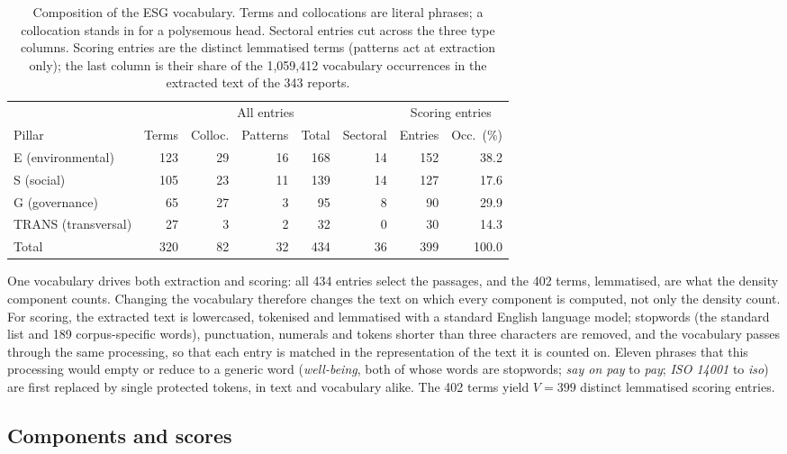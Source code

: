 \begin{table}[tbp]
\centering
\small
\caption{Composition of the ESG vocabulary. Terms and collocations are literal
phrases; a collocation stands in for a polysemous head. Sectoral entries cut
across the three type columns. Scoring entries are the distinct lemmatised
terms (patterns act at extraction only); the last column is their share of the
1,059,412 vocabulary occurrences in the extracted text of the 343 reports.}
\label{tab:method-vocab}
\begin{tabular}{@{}lrrrrrrr@{}}
\toprule
 & \multicolumn{5}{c}{All entries} & \multicolumn{2}{c}{Scoring entries} \\
\cmidrule(lr){2-6}\cmidrule(l){7-8}
Pillar & Terms & Colloc. & Patterns & Total & Sectoral & Entries & Occ.\ (\%) \\
\midrule
E (environmental)   & 123 & 29 & 16 & 168 & 14 & 152 & 38.2 \\
S (social)          & 105 & 23 & 11 & 139 & 14 & 127 & 17.6 \\
G (governance)      &  65 & 27 &  3 &  95 &  8 &  90 & 29.9 \\
TRANS (transversal) &  27 &  3 &  2 &  32 &  0 &  30 & 14.3 \\
\midrule
Total               & 320 & 82 & 32 & 434 & 36 & 399 & 100.0 \\
\bottomrule
\end{tabular}
\end{table}

One vocabulary drives both extraction and scoring: all 434 entries select the
passages, and the 402 terms, lemmatised, are what the density component
counts. Changing the vocabulary therefore changes the text on which every
component is computed, not only the density count. For scoring, the extracted
text is lowercased, tokenised and lemmatised with a standard English language
model; stopwords (the standard list and 189 corpus-specific words),
punctuation, numerals and tokens shorter than three characters are removed, and
the vocabulary passes through the same processing, so that each entry is
matched in the representation of the text it is counted on. Eleven phrases that
this processing would empty or reduce to a generic word (\emph{well-being},
both of whose words are stopwords; \emph{say on pay} to \emph{pay};
\emph{ISO 14001} to \emph{iso}) are first replaced by single protected tokens,
in text and vocabulary alike. The 402 terms yield $V = 399$ distinct
lemmatised scoring entries.

\subsection{Components and scores}
\label{sec:method-index}

